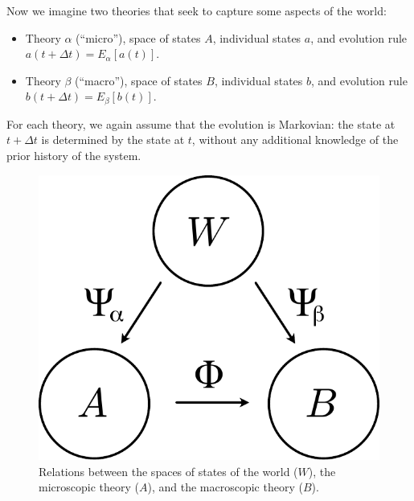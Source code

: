 \documentclass[12pt,english]{article}
\begin{document}
Now we imagine two theories that seek to  capture some aspects of  the world:
\begin{itemize}
    \item Theory $\alpha$ (``micro”), space of states $A$, individual states $a$, and evolution rule $a(t+\Delta t) = E_\alpha[a(t)]$.
\item Theory $\beta$ (``macro”), space of states $B$, individual states $b$, and evolution rule $b(t+\Delta t) = E_\beta[b(t)]$. 
\end{itemize}
For each theory, we again assume that the evolution is Markovian: the state at $t+\Delta t$ is determined by the state at $t$, without any additional knowledge of the prior history of the system. 

\begin{figure}[h]
\includegraphics[scale=0.7]{3circles.pdf}
\centering
\caption{Relations between the spaces of states of the world ($W$), the microscopic theory ($A$), and the macroscopic theory ($B$).}
\label{circles}
\end{figure}
\end{document}
